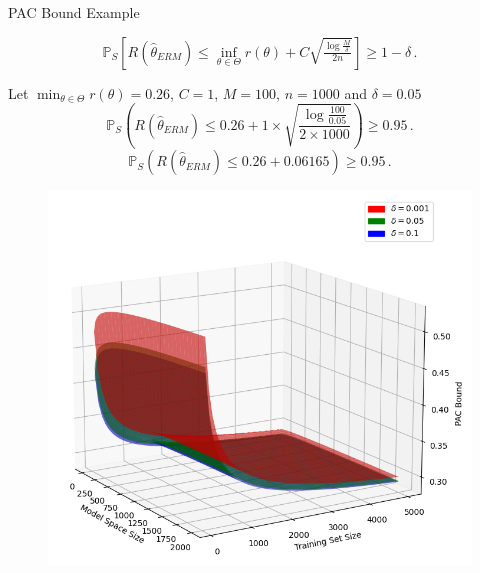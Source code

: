 \documentclass[aspectratio=159]{beamer}
\begin{document}
    {
    \begin{frame}{PAC Bound Example}
    \begin{center}
        \[
            \mathbb{P}_{S}\left[ R(\hat{\theta}_{ERM}) \leq \inf_{\theta \in \Theta} r(\theta) + C \sqrt{\tfrac{\log \tfrac{M}{\delta}}{2n}} \right] \geq 1- \delta\,.
        \]
    \end{center}
    \begin{minipage}{0.5\textwidth}
        Let \(\min_{\theta \in \Theta} r(\theta) = 0.26\), \(C = 1\), \(M = 100\), \(n = 1000\) and  \(\delta = 0.05\)
        \[
            \mathbb{P}_S\left( R(\hat{\theta}_{ERM})\leq 0.26 + 1 \times \sqrt{\frac{\log \frac{100}{0.05}}{2 \times 1000}} \right) \geq 0.95\,.
        \]
        \[
            \mathbb{P}_S\left( R(\hat{\theta}_{ERM})\leq 0.26 + 0.06165 \right) \geq 0.95\,.
        \]
    \end{minipage}
    \begin{minipage}{0.485\textwidth}
        \vspace*{-0.7cm}
        \begin{figure}
            \centering
            \includegraphics[width=\linewidth]{imgs/PAC_Bound.png}
        \end{figure}
        
    \end{minipage}

    \end{frame}
    }
    
\end{document}
